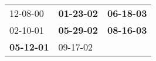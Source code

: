 \begin{supertabular}{p{0.33\columnwidth}p{0.33\columnwidth}p{0.33\columnwidth}}
          12-08-00\textsuperscript{} &  \textbf{01-23-02\textsuperscript{}} &  \textbf{06-18-03\textsuperscript{}} \\
          02-10-01\textsuperscript{} &  \textbf{05-29-02\textsuperscript{}} &  \textbf{08-16-03\textsuperscript{}} \\
 \textbf{05-12-01\textsuperscript{}} &           09-17-02\textsuperscript{} &                                      \\
\end{supertabular}
